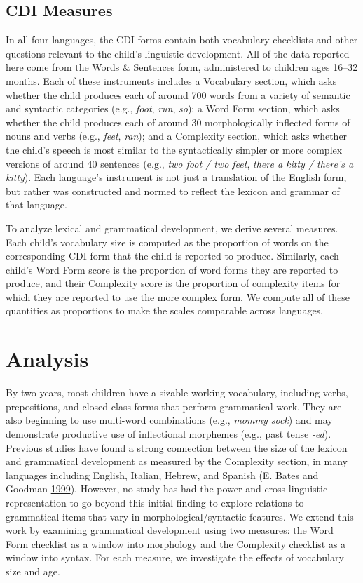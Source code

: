 \documentclass[authoryear, review]{elsarticle}
\begin{document}
\subsection{CDI Measures}\label{cdi-measures}

In all four languages, the CDI forms contain both vocabulary checklists
and other questions relevant to the child's linguistic development. All
of the data reported here come from the Words \& Sentences form,
administered to children ages 16--32 months. Each of these instruments
includes a Vocabulary section, which asks whether the child produces
each of around 700 words from a variety of semantic and syntactic
categories (e.g., \emph{foot}, \emph{run}, \emph{so}); a Word Form
section, which asks whether the child produces each of around 30
morphologically inflected forms of nouns and verbs (e.g., \emph{feet},
\emph{ran}); and a Complexity section, which asks whether the child's
speech is most similar to the syntactically simpler or more complex
versions of around 40 sentences (e.g., \emph{two foot / two feet},
\emph{there a kitty / there's a kitty}). Each language's instrument is
not just a translation of the English form, but rather was constructed
and normed to reflect the lexicon and grammar of that language.

To analyze lexical and grammatical development, we derive several
measures. Each child's vocabulary size is computed as the proportion of
words on the corresponding CDI form that the child is reported to
produce. Similarly, each child's Word Form score is the proportion of
word forms they are reported to produce, and their Complexity score is
the proportion of complexity items for which they are reported to use
the more complex form. We compute all of these quantities as proportions
to make the scales comparable across languages.

\section{Analysis}\label{analysis}

By two years, most children have a sizable working vocabulary, including
verbs, prepositions, and closed class forms that perform grammatical
work. They are also beginning to use multi-word combinations (e.g.,
\emph{mommy sock}) and may demonstrate productive use of inflectional
morphemes (e.g., past tense \emph{-ed}). Previous studies have found a
strong connection between the size of the lexicon and grammatical
development as measured by the Complexity section, in many languages
including English, Italian, Hebrew, and Spanish (E. Bates and Goodman
\hyperref[ref-bates1999]{1999}). However, no study has had the power and
cross-linguistic representation to go beyond this initial finding to
explore relations to grammatical items that vary in
morphological/syntactic features. We extend this work by examining
grammatical development using two measures: the Word Form checklist as a
window into morphology and the Complexity checklist as a window into
syntax. For each measure, we investigate the effects of vocabulary size
and age.
\end{document}
